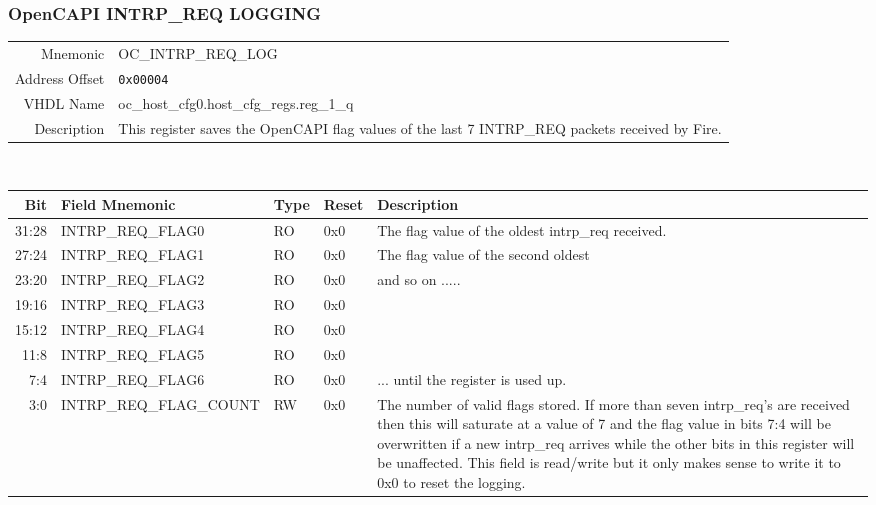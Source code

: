 \subsubsection{OpenCAPI INTRP\_REQ LOGGING}
\begin{tabular}{ r | p{350px} }
  Mnemonic       & OC\_INTRP\_REQ\_LOG                      \\
  Address Offset & \texttt{0x00004}                         \\
  VHDL Name      & oc\_host\_cfg0.host\_cfg\_regs.reg\_1\_q \\ \hline

  Description &
  This register saves the OpenCAPI flag values of the last 7
  INTRP\_REQ packets received by Fire. \\ \hline

\end{tabular}
\\
\begin{tabularx}{\textwidth}{r|l|l|l|X}
  \hline
  Bit   & Field Mnemonic          & Type & Reset & Description \\ \hline

  31:28 & INTRP\_REQ\_FLAG0       & RO   & 0x0   & The flag value of the oldest intrp\_req received. \\
  27:24 & INTRP\_REQ\_FLAG1       & RO   & 0x0   & The flag value of the second oldest               \\
  23:20 & INTRP\_REQ\_FLAG2       & RO   & 0x0   & and so on .....                                   \\
  19:16 & INTRP\_REQ\_FLAG3       & RO   & 0x0   &                                                   \\
  15:12 & INTRP\_REQ\_FLAG4       & RO   & 0x0   &                                                   \\
  11:8  & INTRP\_REQ\_FLAG5       & RO   & 0x0   &                                                   \\
  7:4   & INTRP\_REQ\_FLAG6       & RO   & 0x0   & ... until the register is used up.                \\
  3:0   & INTRP\_REQ\_FLAG\_COUNT & RW   & 0x0   &

  The number of valid flags stored. If more than seven intrp\_req's
  are received then this will saturate at a value of 7 and the flag
  value in bits 7:4 will be overwritten if a new intrp\_req arrives
  while the other bits in this register will be unaffected.  This
  field is read/write but it only makes sense to write it to 0x0 to
  reset the logging. \\
\end{tabularx}

